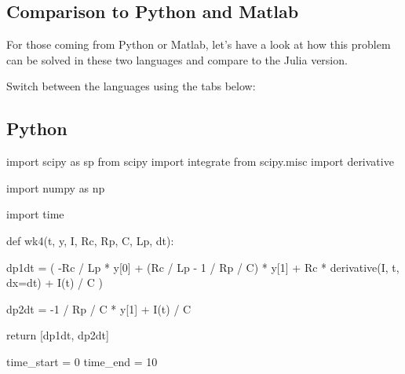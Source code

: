 \documentclass[
  a4paper,
  DIV=11,
  numbers=noendperiod,
  oneside]{scrreprt}
\newenvironment{Shaded}{\begin{snugshade}}{\end{snugshade}}
\newcommand{\ControlFlowTok}[1]{\textcolor[rgb]{0.00,0.23,0.31}{#1}}
\newcommand{\DecValTok}[1]{\textcolor[rgb]{0.68,0.00,0.00}{#1}}
\newcommand{\ImportTok}[1]{\textcolor[rgb]{0.00,0.46,0.62}{#1}}
\newcommand{\KeywordTok}[1]{\textcolor[rgb]{0.00,0.23,0.31}{#1}}
\newcommand{\NormalTok}[1]{\textcolor[rgb]{0.00,0.23,0.31}{#1}}
\newcommand{\OperatorTok}[1]{\textcolor[rgb]{0.37,0.37,0.37}{#1}}
\begin{document}
\hypertarget{sec-odePM}{%
\subsection{Comparison to Python and Matlab}\label{sec-odePM}}

For those coming from Python or Matlab, let's have a look at how this
problem can be solved in these two languages and compare to the Julia
version.

Switch between the languages using the tabs below:

\subsection{Python}

\begin{Shaded}
\begin{Highlighting}[]
\ImportTok{import}\NormalTok{ scipy }\ImportTok{as}\NormalTok{ sp}
\ImportTok{from}\NormalTok{ scipy }\ImportTok{import}\NormalTok{ integrate}
\ImportTok{from}\NormalTok{ scipy.misc }\ImportTok{import}\NormalTok{ derivative}

\ImportTok{import}\NormalTok{ numpy }\ImportTok{as}\NormalTok{ np}

\ImportTok{import}\NormalTok{ time}

\KeywordTok{def}\NormalTok{ wk4(t, y, I, Rc, Rp, C, Lp, dt):}

\NormalTok{    dp1dt }\OperatorTok{=}\NormalTok{ (}
        \OperatorTok{{-}}\NormalTok{Rc }\OperatorTok{/}\NormalTok{ Lp }\OperatorTok{*}\NormalTok{ y[}\DecValTok{0}\NormalTok{]}
        \OperatorTok{+}\NormalTok{ (Rc }\OperatorTok{/}\NormalTok{ Lp }\OperatorTok{{-}} \DecValTok{1} \OperatorTok{/}\NormalTok{ Rp }\OperatorTok{/}\NormalTok{ C) }\OperatorTok{*}\NormalTok{ y[}\DecValTok{1}\NormalTok{]}
        \OperatorTok{+}\NormalTok{ Rc }\OperatorTok{*}\NormalTok{ derivative(I, t, dx}\OperatorTok{=}\NormalTok{dt)}
        \OperatorTok{+}\NormalTok{ I(t) }\OperatorTok{/}\NormalTok{ C}
\NormalTok{    )}

\NormalTok{    dp2dt }\OperatorTok{=} \OperatorTok{{-}}\DecValTok{1} \OperatorTok{/}\NormalTok{ Rp }\OperatorTok{/}\NormalTok{ C }\OperatorTok{*}\NormalTok{ y[}\DecValTok{1}\NormalTok{] }\OperatorTok{+}\NormalTok{ I(t) }\OperatorTok{/}\NormalTok{ C}

    \ControlFlowTok{return}\NormalTok{ [dp1dt, dp2dt]}

\NormalTok{time\_start }\OperatorTok{=} \DecValTok{0}
\NormalTok{time\_end }\OperatorTok{=} \DecValTok{10}


\end{Highlighting}
\end{Shaded}
\end{document}
